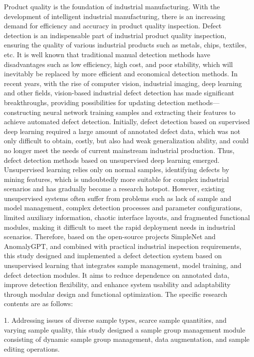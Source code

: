 \documentclass[
  ]{njuthesis}
\begin{document}
\begin{abstract*}
Product quality is the foundation of industrial manufacturing. With the development of intelligent industrial manufacturing, there is an increasing demand for efficiency and accuracy in product quality inspection. Defect detection is an indispensable part of industrial product quality inspection, ensuring the quality of various industrial products such as metals, chips, textiles, etc. It is well known that traditional manual detection methods have disadvantages such as low efficiency, high cost, and poor stability, which will inevitably be replaced by more efficient and economical detection methods. In recent years, with the rise of computer vision, industrial imaging, deep learning and other fields, vision-based industrial defect detection has made significant breakthroughs, providing possibilities for updating detection methods—constructing neural network training samples and extracting their features to achieve automated defect detection. Initially, defect detection based on supervised deep learning required a large amount of annotated defect data, which was not only difficult to obtain, costly, but also had weak generalization ability, and could no longer meet the needs of current mainstream industrial production. Thus, defect detection methods based on unsupervised deep learning emerged. Unsupervised learning relies only on normal samples, identifying defects by mining features, which is undoubtedly more suitable for complex industrial scenarios and has gradually become a research hotspot. However, existing unsupervised systems often suffer from problems such as lack of sample and model management, complex detection processes and parameter configurations, limited auxiliary information, chaotic interface layouts, and fragmented functional modules, making it difficult to meet the rapid deployment needs in industrial scenarios. Therefore, based on the open-source projects SimpleNet and AnomalyGPT, and combined with practical industrial inspection requirements, this study designed and implemented a defect detection system based on unsupervised learning that integrates sample management, model training, and defect detection modules. It aims to reduce dependence on annotated data, improve detection flexibility, and enhance system usability and adaptability through modular design and functional optimization. The specific research contents are as follows:

1. Addressing issues of diverse sample types, scarce sample quantities, and varying sample quality, this study designed a sample group management module consisting of dynamic sample group management, data augmentation, and sample editing operations.


\end{abstract*}
\end{document}
